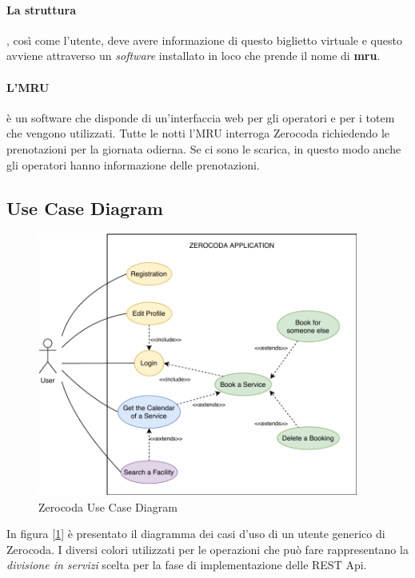 \paragraph{La struttura}, così come l’utente, deve avere informazione di questo biglietto virtuale e questo avviene attraverso un \textsl{software} installato in loco che prende il nome di \textbf{mru}.
\paragraph{L'MRU} è un software che disponde di un'interfaccia web per gli operatori e per i totem che vengono utilizzati. Tutte le notti l'MRU interroga Zerocoda richiedendo le prenotazioni per la giornata odierna. Se ci sono le scarica, in questo modo anche gli operatori hanno informazione delle prenotazioni.

\subsection{Use Case Diagram}
\begin{figure}[H]
    \centering
    \includegraphics[width=0.94\textwidth]{images/02_2_zerocoda_usecase.pdf}
    \caption{Zerocoda Use Case Diagram}
    \label{fig:zerocodausecase}
\end{figure}
In figura [\ref{fig:zerocodausecase}] è presentato il diagramma dei casi d'uso di un utente generico di Zerocoda. I diversi colori utilizzati per le operazioni che può fare rappresentano la \textit{divisione in servizi} scelta per la fase di implementazione delle REST Api.

